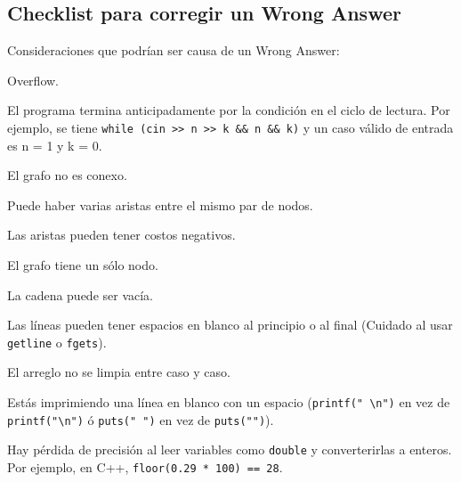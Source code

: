 \documentclass[10pt,letterpaper,twocolumn,twosided]{article}
\begin{document}
\subsection{Checklist para corregir un Wrong Answer}
Consideraciones que podrían ser causa de un Wrong Answer:
\begin{itemize}
  \begin{item}
    Overflow.
  \end{item}

  \begin{item}
    El programa termina anticipadamente por la condición en el ciclo de lectura.
    Por ejemplo, se tiene \verb_while (cin >> n >> k && n && k)_ y un caso válido de entrada
    es n = 1 y k = 0.
  \end{item}

  \begin{item}
    El grafo no es conexo.
  \end{item}

  \begin{item}
    Puede haber varias aristas entre el mismo par de nodos.
  \end{item}

  \begin{item}
    Las aristas pueden tener costos negativos.
  \end{item}

  \begin{item}
    El grafo tiene un sólo nodo.
  \end{item}

  \begin{item}
    La cadena puede ser vacía.
  \end{item}

  \begin{item}
    Las líneas pueden tener espacios en blanco al principio o al final (Cuidado al usar \texttt{getline} o \texttt{fgets}).
  \end{item}

  \begin{item}
    El arreglo no se limpia entre caso y caso.
  \end{item}

  \begin{item}
    Estás imprimiendo una línea en blanco con un espacio (\verb_printf(" \n")_ en vez de \verb_printf("\n")_  ó \verb_puts(" ")_  en vez de \verb_puts("")_).
  \end{item}

  \begin{item}
    Hay pérdida de precisión al leer variables como \verb_double_ y converterirlas a enteros. Por ejemplo, en C++, \verb_floor(0.29 * 100) == 28_.
  \end{item}


\end{itemize}
\end{document}
